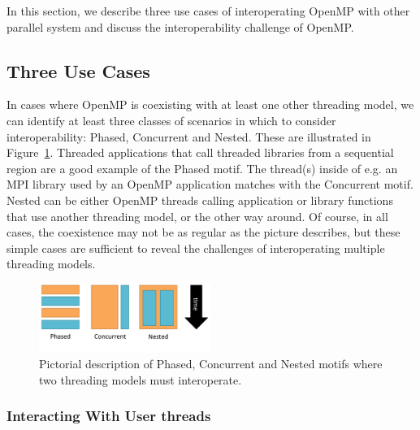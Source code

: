 In this section, we describe three use cases of interoperating OpenMP with other parallel system
and discuss the interoperability challenge of OpenMP.
\subsection{Three Use Cases} %

In cases where OpenMP is coexisting with at least one other threading model,
we can identify at least three classes of scenarios in which to consider
interoperability: Phased, Concurrent and Nested.
These are illustrated in Figure~\ref{fig:interop-motif}.
Threaded applications that call threaded libraries from a sequential region
are a good example of the Phased motif.
The thread(s) inside of e.g. an MPI library used by an OpenMP application
matches with the Concurrent motif.
Nested can be either OpenMP threads calling application or library
functions that use another threading model, or the other way around.
Of course, in all cases, the coexistence may not be as regular as
the picture describes, but these simple cases are sufficient to reveal
the challenges of interoperating multiple threading models.
\begin{figure}[htb]
\centering
\includegraphics[width=0.5\textwidth]{images/interop-motifs}
\caption{Pictorial description of Phased, Concurrent and Nested
motifs where two threading models must interoperate.
\label{fig:interop-motif}
}
\end{figure}


\subsubsection{Interacting With User threads}



